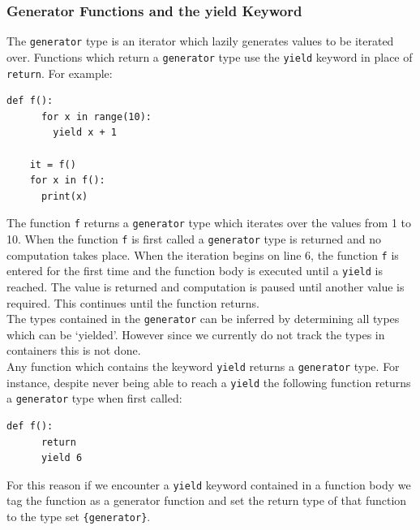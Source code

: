 \documentclass[12pt, titlepage]{article}
\begin{document}
\subsubsection{Generator Functions and the yield Keyword}
The \texttt{generator} type is an iterator which lazily generates values to be iterated over. Functions which return a \texttt{generator} type use the \texttt{yield} keyword in place of \texttt{return}. For example:
\begin{lstlisting}[mathescape]
    def f():
      for x in range(10):
        yield x + 1
    
    it = f()
    for x in f():
      print(x)
\end{lstlisting}
The function \texttt{f} returns a \texttt{generator} type which iterates over the values from 1 to 10. When the function \texttt{f} is first called a \texttt{generator} type is returned and no computation takes place. When the iteration begins on line 6, the function \texttt{f} is entered for the first time and the function body is executed until a \texttt{yield} is reached. The value is returned and computation is paused until another value is required. This continues until the function returns. \\
\indent The types contained in the \texttt{generator} can be inferred by determining all types which can be `yielded'. However since we currently do not track the types in containers this is not done. \\
\indent Any function which contains the keyword \texttt{yield} returns a \texttt{generator} type. For instance, despite never being able to reach a \texttt{yield} the following function returns a \texttt{generator} type when first called:
\begin{lstlisting}[mathescape]
    def f():
      return
      yield 6
\end{lstlisting}
For this reason if we encounter a \texttt{yield} keyword contained in a function body we tag the function as a generator function and set the return type of that function to the type set \texttt{\{generator\}}.
\end{document}
